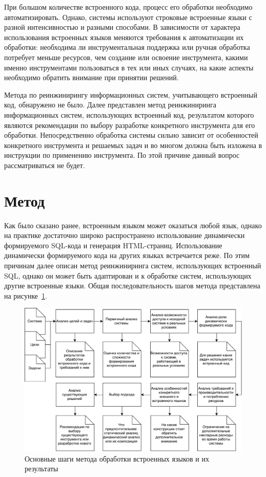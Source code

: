 При большом количестве встроенного кода, процесс его обработки необходимо автоматизировать. Однако, системы используют строковые встроенные языки с разной интенсивностью и разными способами. В зависимости от характера использования встроенных языков меняются требования к автоматизации их обработки: необходима ли инструментальная поддержка или ручная обработка потребует меньше ресурсов, чем создание или освоение инструмента, какими именно инструментами пользоваться в тех или иных случаях, на какие аспекты необходимо обратить внимание при принятии решений.

Метода по реинжинирингу информационных систем, учитывающего встроенный код, обнаружено не было. Далее представлен метод реинжиниринга информационных систем, использующих встроенный код, результатом которого являются рекомендации по выбору разработке конкретного инструмента для его обработки. Непосредственно обработка системы сильно зависит от особенностей конкретного инструмента и решаемых задач и во многом должна быть изложена в инструкции по применению инструмента. По этой причине данный вопрос рассматриваться не будет.


\section{Метод}

Как было сказано ранее, встроенным языком может оказаться любой язык, однако на практике достаточно широко распространено использование динамически формируемого SQL-кода и генерация HTML-страниц. Использование динамически формируемого кода на других языках встречается реже. По этим причинам далее описан метод реинжиниринга систем, использующих встроенный SQL, однако он может быть адаптирован и к обработке систем, использующих другие встроенные языки. Общая последовательность шагов метода представлена на рисунке~\ref{fig:method}.

\begin{figure}[h!]
\begin{center}
\includegraphics[width=.95\textwidth]{pics/ReengMethodSteps}
\caption{Основные шаги метода обработки встроенных языков и их результаты}
\label{fig:method} 
\end{center}
\end{figure}


